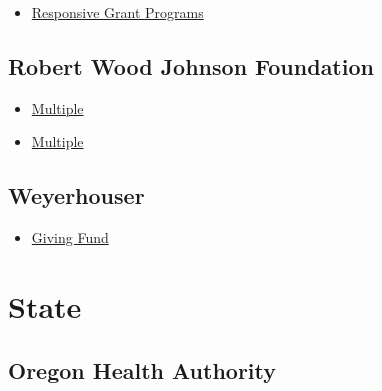 \documentclass[
  letterpaper,
  DIV=11,
  numbers=noendperiod]{scrreprt}
\providecommand{\tightlist}{%
  \setlength{\itemsep}{0pt}\setlength{\parskip}{0pt}}\usepackage{longtable,booktabs,array}
\begin{document}
\begin{itemize}
\tightlist
\item
  \href{https://thereserfamilyfoundation.org/apply-for-a-grant/}{Responsive
  Grant Programs}
\end{itemize}

\subsection{Robert Wood Johnson
Foundation}\label{robert-wood-johnson-foundation}

\begin{itemize}
\tightlist
\item
  \href{https://www.rwjf.org/en/grants.html}{Multiple}
\item
  \href{https://www.rwjf.org/en/grants/active-funding-opportunities.html?o=1&us=1}{Multiple}
\end{itemize}

\subsection{Weyerhouser}\label{weyerhouser}

\begin{itemize}
\tightlist
\item
  \href{https://www.weyerhaeuser.com/company/values/citizenship/giving-fund/}{Giving
  Fund}
\end{itemize}

\section{State}\label{state}

\subsection{Oregon Health Authority}\label{oregon-health-authority}
\end{document}
